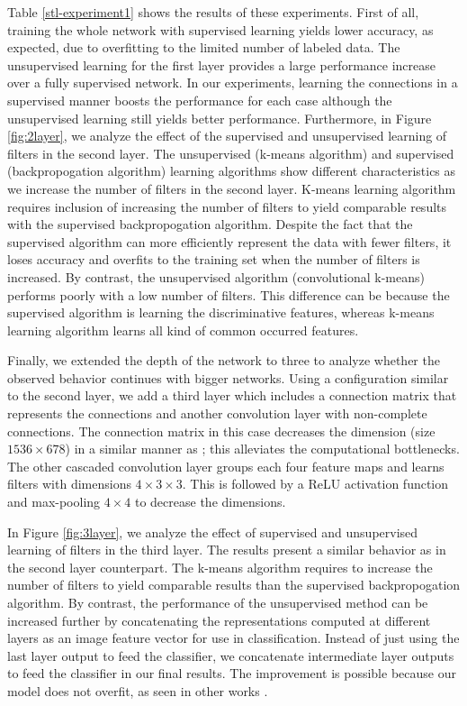 \documentclass{article} \usepackage{iclr2016_workshop,times}
\begin{document}
Table \ref{stl-experiment1} shows the results of these experiments. First of all, training the whole network with supervised learning yields lower accuracy, as expected, due to overfitting to the limited number of labeled data.
The unsupervised learning for the first layer provides a large performance increase over a fully supervised network.
In our experiments, learning the connections in a supervised manner boosts the performance for each case although the unsupervised learning still yields better performance. Furthermore, in Figure \ref{fig:2layer}, we analyze the effect of the supervised and unsupervised learning of filters in the second layer.
The unsupervised (k-means algorithm) and supervised (backpropogation algorithm) learning algorithms show different characteristics as we increase the number of filters in the second layer.
K-means learning algorithm requires inclusion of increasing the number of filters to yield comparable results with the supervised backpropogation algorithm.
Despite the fact that the supervised algorithm can more efficiently represent the data with fewer filters, it loses accuracy and overfits to the training set when the number of filters is increased.
By contrast, the unsupervised algorithm (convolutional k-means) performs poorly with a low number of filters.
This difference can be because the supervised algorithm is learning the discriminative features, whereas k-means learning algorithm learns all kind of common occurred features.

Finally, we extended the depth of the network to three to analyze whether the observed behavior continues with bigger networks.
Using a configuration similar to the second layer, we add a third layer which includes a connection matrix that represents the connections and another convolution layer with non-complete connections.
The connection matrix in this case decreases the dimension (size $1536 \times 678 $) in a similar manner as \citet{szegedy2014going}; this alleviates the computational bottlenecks.
The other cascaded convolution layer groups each four feature maps and learns filters with dimensions $4\times3\times3$. This is followed by a ReLU activation function and max-pooling $4\times4$ to decrease the dimensions.

In Figure \ref{fig:3layer}, we analyze the effect of supervised and unsupervised learning of filters in the third layer.
The results present a similar behavior as in the second layer counterpart.
The k-means algorithm requires to increase the number of filters to yield comparable results than the supervised backpropogation algorithm.
By contrast, the performance of the unsupervised method can be increased further by concatenating the representations computed at different layers as an image feature vector for use in classification.
Instead of just using the last layer output to feed the classifier, we concatenate intermediate layer outputs to feed the classifier in our final results. The improvement is possible because our model does not overfit, as seen in other works \citep{coates2011selecting,lin2014stable}.
\end{document}
